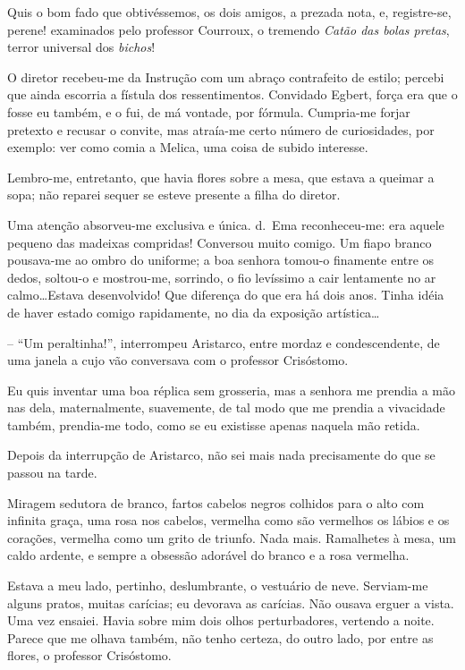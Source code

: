 Quis o bom fado que obtivéssemos, os dois amigos, a prezada
nota, e, registre{}-se, perene! examinados pelo professor Courroux, o
tremendo \textit{Catão das bolas pretas}, terror universal dos \textit{bichos}!

O diretor recebeu{}-me da Instrução com um abraço contrafeito de estilo; percebi
que ainda escorria a fístula dos ressentimentos. Convidado Egbert,
força era que o fosse eu também, e o fui, de má vontade, por fórmula.
Cumpria{}-me forjar pretexto e recusar o convite, mas atraía{}-me certo
número de curiosidades, por exemplo: ver como comia a Melica, uma coisa
de subido interesse. 

Lembro{}-me, entretanto, que havia flores sobre a
mesa, que estava a queimar a sopa; não reparei sequer se esteve presente 
a filha do diretor. 

Uma atenção absorveu{}-me
exclusiva e única. d.~Ema reconheceu{}-me: era aquele pequeno das
madeixas compridas! Conversou muito comigo. Um fiapo branco
pousava{}-me ao ombro do uniforme; a boa senhora tomou{}-o finamente
entre os dedos, soltou{}-o e mostrou{}-me, sorrindo, o fio levíssimo a
cair lentamente no ar calmo\ldots Estava desenvolvido! Que diferença do
que era há dois anos. Tinha idéia de haver estado comigo rapidamente,
no dia da exposição artística\ldots 

-- ``Um peraltinha!'', interrompeu Aristarco, entre mordaz e condescendente, 
de uma janela a cujo vão
conversava com o professor Crisóstomo. 

Eu quis inventar uma boa réplica
sem grosseria, mas a senhora me prendia a mão nas dela, maternalmente,
suavemente, de tal modo que me prendia a vivacidade também,
prendia{}-me todo, como se eu existisse apenas naquela mão retida.

Depois da interrupção de Aristarco, não sei mais nada precisamente do
que se passou na tarde. 

Miragem sedutora de branco, fartos cabelos
negros colhidos para o alto com infinita graça, uma rosa nos cabelos,
vermelha como são vermelhos os lábios e os corações, vermelha como um
grito de triunfo. Nada mais. Ramalhetes à mesa, um caldo ardente, e
sempre a obsessão adorável do branco e a rosa vermelha. 

Estava a meu
lado, pertinho, deslumbrante, o vestuário de neve. Serviam{}-me alguns
pratos, muitas carícias; eu devorava as carícias. Não ousava erguer a
vista. Uma vez ensaiei. Havia sobre mim dois olhos perturbadores,
vertendo a noite. Parece que me olhava também, não tenho certeza, do
outro lado, por entre as flores, o professor Crisóstomo. 

